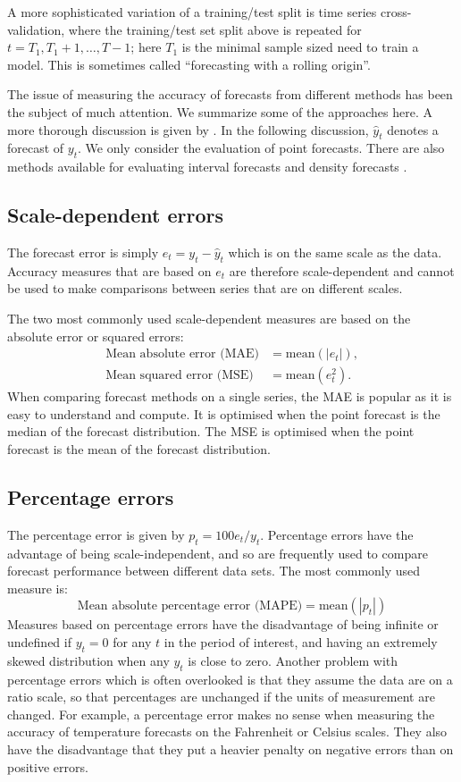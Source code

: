 \documentclass[a4paper,10pt]{article}
\def\mean{\text{mean}}
\begin{document}
A more sophisticated variation of a training/test split is time series cross-validation, where the training/test set split above is repeated for $t = T_1,T_1+1,\dots,T-1$; here $T_1$ is the minimal sample sized need to train a model. This is sometimes called ``forecasting with a rolling origin''.

The issue of measuring the accuracy of forecasts from different methods has been the subject of much attention. We summarize some of the approaches here. A more thorough discussion is given by \citet{HK06}. In the following discussion, $\hat{y}_t$ denotes a forecast of $y_t$. We only consider the evaluation of point forecasts. There are also methods available for evaluating interval forecasts and density forecasts \citep{fpp3}.

\subsection*{Scale-dependent errors}

The forecast error is simply $e_t=y_t-\hat{y}_{t}$ which is on the same scale as the data. Accuracy measures that are based on $e_t$ are therefore scale-dependent and cannot be used to make comparisons between series that are on different scales.

The two most commonly used scale-dependent measures are based on the absolute error or squared errors:
\begin{align*}
  \text{Mean absolute error (MAE)} & = \mean(|e_{t}|), \\
  \text{Mean squared error (MSE)}  & = \mean(e_{t}^2).
\end{align*}
When comparing forecast methods on a single series, the MAE is popular as it is easy to understand and compute. It is optimised when the point forecast is the median of the forecast distribution. The MSE is optimised when the point forecast is the mean of the forecast distribution.

\subsection*{Percentage errors}

The percentage error is given by $p_t = 100 e_t/y_t$. Percentage errors have the advantage of being scale-independent, and so are frequently used to compare forecast performance between different
data sets. The most commonly used measure is:
\[
  \text{Mean absolute percentage error (MAPE)} = \mean(|p_{t}|)
\]
Measures based on percentage errors have the disadvantage of being infinite or undefined if $y_t=0$ for any $t$ in the period of interest, and having an extremely skewed distribution when any $y_t$ is close to zero. Another problem with percentage errors which is often overlooked is that they assume the data are on a ratio scale, so that percentages are unchanged if the units of measurement are changed. For example, a percentage error makes no sense when measuring the accuracy of temperature forecasts on the Fahrenheit or Celsius scales. They also have the disadvantage that they put a heavier penalty on negative errors than on positive errors.
\end{document}

